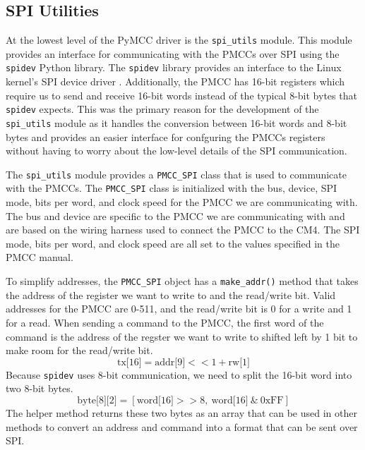 \subsection{SPI Utilities}
At the lowest level of the PyMCC driver is the \verb|spi_utils| module.
This module provides an interface for communicating with the PMCCs over SPI using the \verb|spidev| Python library.
The \verb|spidev| library provides an interface to the Linux kernel's SPI device driver \cite{spidev}.
Additionally, the PMCC has 16-bit registers which require us to send and receive 16-bit words instead of the typical 8-bit bytes that \verb|spidev| expects. 
This was the primary reason for the development of the \verb|spi_utils| module as it handles the conversion between 16-bit words and 8-bit bytes and provides an easier interface for confguring the PMCCs registers without having to worry about the low-level details of the SPI communication.

The \verb|spi_utils| module provides a \verb|PMCC_SPI| class that is used to communicate with the PMCCs.
The \verb|PMCC_SPI| class is initialized with the bus, device, SPI mode, bits per word, and clock speed for the PMCC we are communicating with.
The bus and device are specific to the PMCC we are communicating with and are based on the wiring harness used to connect the PMCC to the CM4.
The SPI mode, bits per word, and clock speed are all set to the values specified in the PMCC manual.

To simplify addresses, the \verb|PMCC_SPI| object has a \verb|make_addr()| method that takes the address of the register we want to write to and the read/write bit.
Valid addresses for the PMCC are 0-511, and the read/write bit is 0 for a write and 1 for a read.
When sending a command to the PMCC, the first word of the command is the address of the regster we want to write to shifted left by 1 bit to make room for the read/write bit.
\begin{equation}
    \text{tx[16]} = \text{addr[9]} << 1 + \text{rw[1]}
\end{equation}
Because \verb|spidev| uses 8-bit communication, we need to split the 16-bit word into two 8-bit bytes.
\begin{equation}
    \label{eq:split_word}
    \text{byte[8][2]} = [\text{word[16]} >> 8,\ \text{word[16]}\ \text{\&}\ \text{0xFF}]
\end{equation}
The helper method returns these two bytes as an array that can be used in other methods to convert an address and command into a format that can be sent over SPI.

